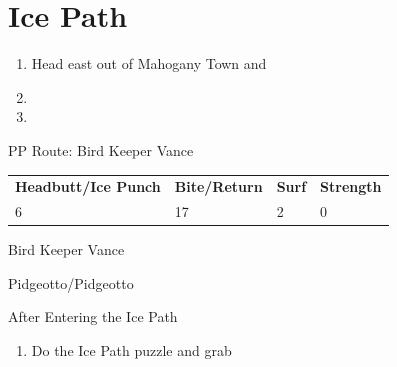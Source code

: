 \chapter{Ice Path}
\vspace{0.5mm}

\begin{paracol}{2}
\begin{enumerate}
	\item Head east out of Mahogany Town and 
	\item {}
	\item {}
\end{enumerate}

\switchcolumn
\begin{misc}{PP Route: Bird Keeper Vance}
	\varwb
	\begin{tabu} to \textwidth {X[6,c] X[5,c] X[4,c] X[4,c]}
		\textbf{Headbutt/Ice Punch} & \textbf{Bite/Return} & \textbf{Surf} & \textbf{Strength}\\ 
		6 & 17 & 2 & 0
	\end{tabu}
	\varwe
\end{misc}

\switchcolumn
\begin{trainer}{Bird Keeper Vance}
	\varwb
	\begin{fightSection}{Pidgeotto/Pidgeotto}
		\item {} \strength{} 
	\end{fightSection}
	\varwe
\end{trainer}

\begin{menu}{After Entering the Ice Path}
	\varwb
	\begin{packMenu}
		\item \superRepel
	\end{packMenu}
	\varwe
\end{menu}

\begin{enumerate}[resume]
	\item Do the Ice Path puzzle  and grab 
\end{enumerate}


\end{paracol}
